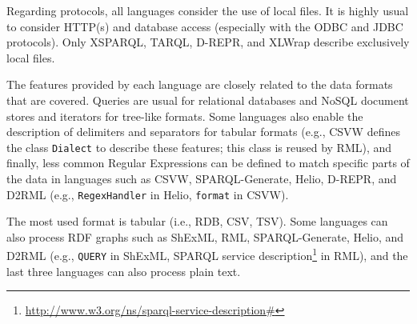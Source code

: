 Regarding protocols, all languages consider the use of local files. It is highly usual to consider HTTP(s) and database access (especially with the ODBC and JDBC protocols). Only XSPARQL, TARQL, D-REPR, and XLWrap describe exclusively local files. 

The features provided by each language are closely related to the data formats that are covered. Queries are usual for relational databases and NoSQL document stores and iterators for tree-like formats. Some languages also enable the description of delimiters and separators for tabular formats (e.g., CSVW defines the class \texttt{Dialect} to describe these features; this class is reused by RML), and finally, less common Regular Expressions can be defined to match specific parts of the data in languages such as CSVW, SPARQL-Generate, Helio, D-REPR, and D2RML (e.g., \texttt{RegexHandler} in Helio, \texttt{format} in CSVW). 

The most used format is tabular (i.e., RDB, CSV, TSV). Some languages can also process RDF graphs such as ShExML, RML, SPARQL-Generate, Helio, and D2RML (e.g., \texttt{QUERY} in ShExML,  SPARQL service description\footnote{\url{http://www.w3.org/ns/sparql-service-description\#}} in RML), and the last three languages can also process plain text.









